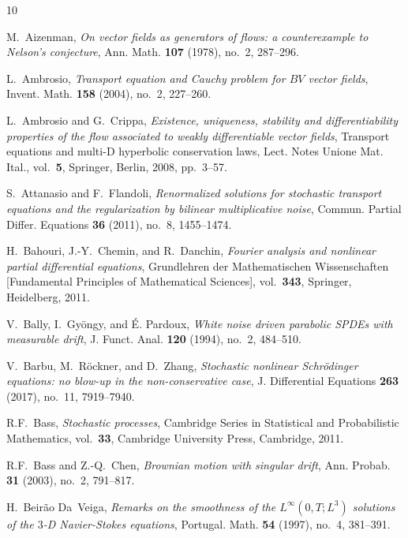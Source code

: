 \documentclass[a4paper,10pt]{article}
\newcommand\1{\mathbbm{1}}
\numberwithin{equation}{section}
\begin{document}
\begin{thebibliography}{10}

M.~Aizenman, \emph{On vector fields as generators of flows: a counterexample to {N}elson's conjecture}, Ann. Math. \textbf{107} (1978), no.~2, 287--296.

L.~Ambrosio, \emph{Transport equation and {C}auchy problem for {$BV$} vector
  fields}, Invent. Math. \textbf{158} (2004), no.~2, 227--260.

L.~Ambrosio and G.~Crippa, \emph{Existence, uniqueness, stability and
  differentiability properties of the flow associated to weakly differentiable vector fields}, Transport equations and multi-{D} hyperbolic conservation laws, Lect. Notes Unione Mat. Ital., vol.~\textbf{5}, Springer, Berlin, 2008, pp.~3--57.

S.~Attanasio and F.~Flandoli, \emph{Renormalized solutions for stochastic
  transport equations and the regularization by bilinear multiplicative noise}, Commun. Partial Differ. Equations \textbf{36} (2011), no.~8, 1455--1474.

H.~Bahouri, J.-Y.~Chemin, and R.~Danchin, \emph{Fourier analysis and nonlinear partial differential equations}, Grundlehren der Mathematischen
  Wissenschaften [Fundamental Principles of Mathematical Sciences],
  vol.~\textbf{343}, Springer, Heidelberg, 2011.

V.~Bally, I.~Gy\"{o}ngy, and \'{E}. Pardoux, \emph{White noise driven parabolic {SPDE}s with measurable drift}, J. Funct. Anal. \textbf{120} (1994), no.~2, 484--510.

V.~Barbu, M.~R\"{o}ckner, and D.~Zhang, \emph{Stochastic nonlinear
  {S}chr\"{o}dinger equations: no blow-up in the non-conservative case}, J.
  Differential Equations \textbf{263} (2017), no.~11, 7919--7940.

R.F.~Bass, \emph{Stochastic processes}, Cambridge Series in Statistical and
  Probabilistic Mathematics, vol.~\textbf{33}, Cambridge University Press,
  Cambridge, 2011.

R.F.~Bass and Z.-Q.~Chen, \emph{Brownian motion with singular drift}, Ann.
  Probab. \textbf{31} (2003), no.~2, 791--817.

H.~Beir\~{a}o Da~Veiga, \emph{Remarks on the smoothness of the
  {$L^\infty(0,T;L^3)$} solutions of the {$3$}-{D} {N}avier-{S}tokes
  equations}, Portugal. Math. \textbf{54} (1997), no.~4, 381--391.


\end{thebibliography}
\end{document}
